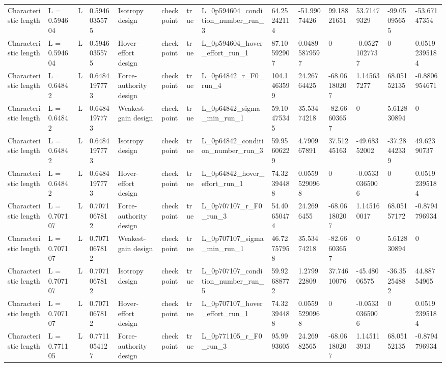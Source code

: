 \begin{tabular}{@{}llllllllllllll@{}}
Characteristic length & L = 0.594604 & L & 0.5946035575 & Isotropy design & checkpoint & true & L\_0p594604\_condition\_number\_run\_3 & 64.25242114 & -51.99074426 & 99.18821651 & 53.71479329 & -99.05095655 & -53.67147354 \\
Characteristic length & L = 0.594604 & L & 0.5946035575 & Hover-effort design & checkpoint & true & L\_0p594604\_hover\_effort\_run\_1 & 87.10592907 & 0.04895879597 & 0 & -0.05271027737 & 0 & 0.05192395184 \\
Characteristic length & L = 0.64842 & L & 0.6484197773 & Force-authority design & checkpoint & true & L\_0p64842\_r\_F0\_run\_4 & 104.1463599 & 24.26764425 & -68.06180207 & 1.145637277 & 68.05152135 & -0.8806954671 \\
Characteristic length & L = 0.64842 & L & 0.6484197773 & Weakest-gain design & checkpoint & true & L\_0p64842\_sigma\_min\_run\_1 & 59.10475345 & 35.53474218 & -82.66603657 & 0 & 5.612830894 & 0 \\
Characteristic length & L = 0.64842 & L & 0.6484197773 & Isotropy design & checkpoint & true & L\_0p64842\_condition\_number\_run\_3 & 59.95606229 & 4.790967891 & 37.51245163 & -49.68352002 & -37.28442339 & 49.62390737 \\
Characteristic length & L = 0.64842 & L & 0.6484197773 & Hover-effort design & checkpoint & true & L\_0p64842\_hover\_effort\_run\_1 & 74.32394488 & 0.05595290968 & 0 & -0.05330365006 & 0 & 0.05192395184 \\
Characteristic length & L = 0.707107 & L & 0.7071067812 & Force-authority design & checkpoint & true & L\_0p707107\_r\_F0\_run\_3 & 54.40650474 & 24.2696455 & -68.06180207 & 1.145160017 & 68.05157172 & -0.8794796934 \\
Characteristic length & L = 0.707107 & L & 0.7071067812 & Weakest-gain design & checkpoint & true & L\_0p707107\_sigma\_min\_run\_1 & 46.72757958 & 35.53474218 & -82.66603657 & 0 & 5.612830894 & 0 \\
Characteristic length & L = 0.707107 & L & 0.7071067812 & Isotropy design & checkpoint & true & L\_0p707107\_condition\_number\_run\_5 & 59.92688772 & 1.279922809 & 37.74610076 & -45.48006575 & -36.35254882 & 44.88754965 \\
Characteristic length & L = 0.707107 & L & 0.7071067812 & Hover-effort design & checkpoint & true & L\_0p707107\_hover\_effort\_run\_1 & 74.32394488 & 0.05595290968 & 0 & -0.05330365006 & 0 & 0.05192395184 \\
Characteristic length & L = 0.771105 & L & 0.7711054127 & Force-authority design & checkpoint & true & L\_0p771105\_r\_F0\_run\_3 & 95.9993605 & 24.26982565 & -68.06180207 & 1.145113913 & 68.05152135 & -0.8794796934 \\

\end{tabular}
